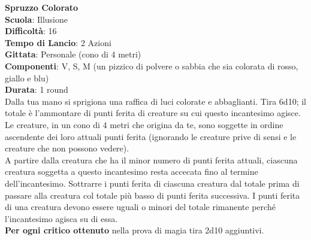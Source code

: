 \begin{multicols}{2}
\medskip\textbf{Spruzzo Colorato}\\
\textbf{Scuola}: Illusione\\
\textbf{Difficoltà}: 16\\
\textbf{Tempo di Lancio}: 2 Azioni\\
\textbf{Gittata}: Personale (cono di 4 metri)\\
\textbf{Componenti}: V, S, M (un pizzico di polvere o sabbia che sia colorata di rosso, giallo e blu)\\
\textbf{Durata}: 1 round\\
Dalla tua mano si sprigiona una raffica di luci colorate e abbaglianti. Tira 6d10; il totale è l'ammontare di punti ferita di creature su cui questo incantesimo agisce. Le creature, in un cono di 4 metri che origina da te, sono soggette in ordine ascendente dei loro attuali punti ferita (ignorando le creature prive di sensi e le creature che non possono vedere).\\
A partire dalla creatura che ha il minor numero di punti ferita attuali, ciascuna creatura soggetta a questo incantesimo resta accecata fino al termine dell'incantesimo. Sottrarre i punti ferita di ciascuna creatura dal totale prima di passare alla creatura col totale più basso di punti ferita successiva. I punti ferita di una creatura devono essere uguali o minori del totale rimanente perché l'incantesimo agisca su di essa. \\
\textbf{Per ogni critico ottenuto} nella prova di magia tira 2d10 aggiuntivi.


\end{multicols}

